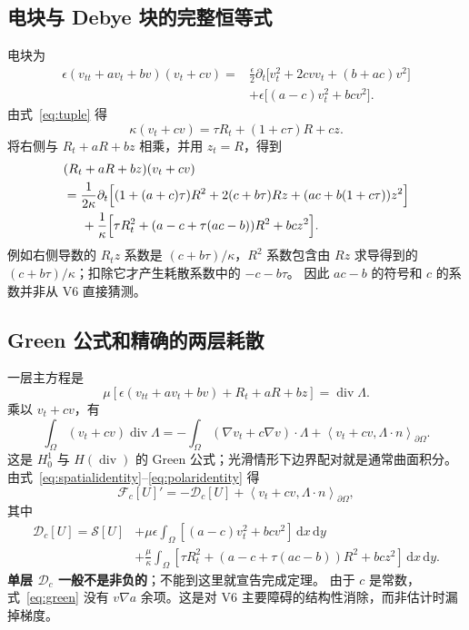 \documentclass[UTF8,a4paper,11pt,fontset=none]{ctexart}
\numberwithin{equation}{section}
\theoremstyle{definition}
\theoremstyle{definition}
\newcommand{\Om}{\Omega}
\newcommand{\eps}{\epsilon}
\newcommand{\dd}{\,\mathrm d}
\newcommand{\Fc}{\mathcal F_c}
\newcommand{\Dc}{\mathcal D_c}
\newcommand{\Sc}{\mathscr S}
\newcommand{\ip}[2]{\left\langle #1,#2\right\rangle}
\DeclareMathOperator{\diver}{div}
\begin{document}
\subsection{电块与 Debye 块的完整恒等式}
电块为
\begin{equation}\label{eq:electric-identity}
\begin{aligned}
 \eps(v_{tt}+av_t+bv)(v_t+cv)
 ={}&\frac\eps2\partial_t\big[v_t^2+2cvv_t+(b+ac)v^2\big]\\
 &+\eps\big[(a-c)v_t^2+bcv^2\big].
\end{aligned}
\end{equation}
由式~\eqref{eq:tuple} 得
\[
 \kappa(v_t+cv)=\tau R_t+(1+c\tau)R+cz.
\]
将右侧与 $R_t+aR+bz$ 相乘，并用 $z_t=R$，得到
\begin{equation}\label{eq:polaridentity}
\begin{aligned}
 &(R_t+aR+bz)(v_t+cv)\\
 &=\frac1{2\kappa}\partial_t\Big[(1+(a+c)\tau)R^2
       +2(c+b\tau)Rz+(ac+b(1+c\tau))z^2\Big]\\
 &\hspace{5mm}+\frac1\kappa\Big[\tau R_t^2+
       (a-c+\tau(ac-b))R^2+bcz^2\Big].
\end{aligned}
\end{equation}
例如右侧导数的 $R_tz$ 系数是 $(c+b\tau)/\kappa$，$R^2$ 系数包含由 $Rz$ 求导得到的 $(c+b\tau)/\kappa$；扣除它才产生耗散系数中的 $-c-b\tau$。
因此 $ac-b$ 的符号和 $c$ 的系数并非从 V6 直接猜测。

\subsection{Green 公式和精确的两层耗散}
一层主方程是
\[
 \mu[\eps(v_{tt}+av_t+bv)+R_t+aR+bz]=\diver\Lambda.
\]
乘以 $v_t+cv$，有
\begin{equation}\label{eq:green}
 \int_\Om(v_t+cv)\diver\Lambda
 =-\int_\Om(\nabla v_t+c\nabla v)\cdot\Lambda
   +\ip{v_t+cv}{\Lambda\cdot n}_{\partial\Om}.
\end{equation}
这是 $H_0^1$ 与 $H(\diver)$ 的 Green 公式；光滑情形下边界配对就是通常曲面积分。
由式~\eqref{eq:spatialidentity}--\eqref{eq:polaridentity} 得
\begin{equation}\label{eq:Fcderivative}
 \Fc[U]'=-\Dc[U]+\ip{v_t+cv}{\Lambda\cdot n}_{\partial\Om},
\end{equation}
其中
\begin{equation}\label{eq:Dc}
\begin{aligned}
 \Dc[U]=\Sc[U]
 &+\mu\eps\int_\Om[(a-c)v_t^2+bcv^2]\dd x\dd y\\
 &+\frac\mu\kappa\int_\Om[\tau R_t^2+(a-c+\tau(ac-b))R^2+bcz^2]\dd x\dd y.
\end{aligned}
\end{equation}
\textbf{单层 $\Dc$ 一般不是非负的}；不能到这里就宣告完成定理。
由于 $c$ 是常数，式~\eqref{eq:green} 没有 $v\nabla a$ 余项。这是对 V6 主要障碍的结构性消除，而非估计时漏掉梯度。
\end{document}
